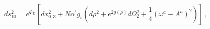 \begin{equation}
\label{metric} ds^2_{10}=e^{\Phi_D} \left[
dx^2_{0,3}+N\alpha^\prime g_s \left(d\rho^2+e^{2g(\rho)} d\Omega_2^2
+\frac{1}{4} (\omega^a-A^a)^2\right) \right]\,,
\end{equation}

